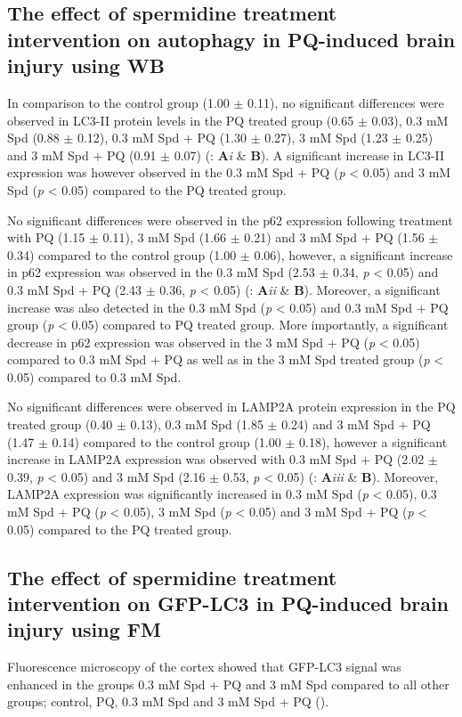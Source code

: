 \subsection{The effect of spermidine treatment intervention on autophagy in PQ-induced brain injury using WB}
In comparison to the control group (1.00 $\pm$ 0.11), no significant differences were observed in LC3-II protein levels in the PQ treated group (0.65 $\pm$ 0.03), 0.3 mM Spd (0.88 $\pm$ 0.12), 0.3 mM Spd + PQ (1.30 $\pm$ 0.27), 3 mM Spd (1.23 $\pm$ 0.25) and 3 mM Spd + PQ (0.91 $\pm$ 0.07) (: \textbf{A}\textit{i} \& \textbf{B}). A significant increase in LC3-II expression was however observed in the 0.3 mM Spd + PQ (\textit{p} < 0.05) and 3 mM Spd (\textit{p} < 0.05) compared to the PQ treated group. 

No significant differences were observed in the p62 expression following treatment with PQ (1.15 $\pm$ 0.11), 3 mM Spd (1.66 $\pm$ 0.21) and 3 mM Spd + PQ (1.56 $\pm$ 0.34) compared to the control  group (1.00 $\pm$ 0.06), however, a significant increase in p62 expression was observed in the 0.3 mM Spd (2.53 $\pm$ 0.34, \textit{p} < 0.05) and 0.3 mM Spd + PQ (2.43 $\pm$ 0.36, \textit{p} < 0.05) (: \textbf{A}\textit{ii} \& \textbf{B}). Moreover, a significant increase was also detected in the 0.3 mM Spd (\textit{p} < 0.05) and 0.3 mM Spd + PQ group (\textit{p} < 0.05) compared to PQ treated group. More importantly, a significant decrease in p62 expression was observed in the 3 mM Spd + PQ (\textit{p} < 0.05) compared to 0.3 mM Spd + PQ as well as in the 3 mM Spd treated group (\textit{p} < 0.05) compared to 0.3 mM Spd. 

No significant differences were observed in LAMP2A protein expression in the PQ treated group (0.40 $\pm$ 0.13), 0.3 mM Spd (1.85 $\pm$ 0.24) and 3 mM Spd + PQ (1.47 $\pm$ 0.14) compared to the control group (1.00 $\pm$ 0.18), however a significant increase in LAMP2A expression was observed with 0.3 mM Spd + PQ (2.02 $\pm$ 0.39, \textit{p} < 0.05) and 3 mM Spd (2.16 $\pm$ 0.53, \textit{p} < 0.05) (: \textbf{A}\textit{iii} \& \textbf{B}). Moreover, LAMP2A expression was significantly increased in 0.3 mM Spd (\textit{p} < 0.05), 0.3 mM Spd + PQ (\textit{p} < 0.05), 3 mM Spd (\textit{p} < 0.05)  and 3 mM Spd + PQ (\textit{p} < 0.05) compared to the PQ treated group.

\subsection{The effect of spermidine treatment intervention on GFP-LC3 in PQ-induced brain injury using FM}
Fluorescence microscopy of the cortex showed that GFP-LC3 signal was enhanced in the groups 0.3 mM Spd + PQ and 3 mM Spd compared to all other groups; control, PQ,  0.3 mM Spd and 3 mM Spd + PQ ().

